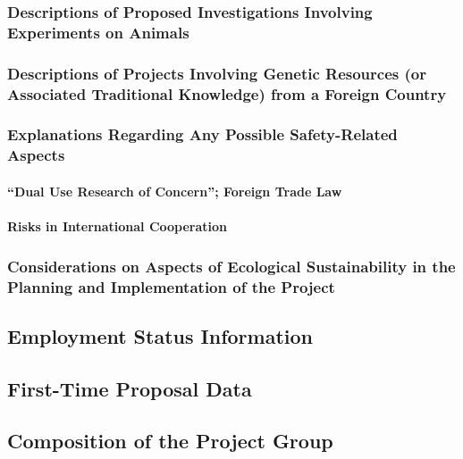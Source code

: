 \documentclass[de]{dfg-proposal}
\begin{document}

\subsubsection{Descriptions of Proposed Investigations Involving Experiments on Animals}

\subsubsection{Descriptions of Projects Involving Genetic Resources (or Associated Traditional Knowledge) from a Foreign Country}

\subsubsection{Explanations Regarding Any Possible Safety-Related Aspects}

\paragraph{``Dual Use Research of Concern''; Foreign Trade Law}

\paragraph{Risks in International Cooperation}

\subsubsection{Considerations on Aspects of Ecological Sustainability in the Planning and Implementation of the Project}

\subsection{Employment Status Information}

\subsection{First-Time Proposal Data}

\subsection{Composition of the Project Group}
\end{document}
